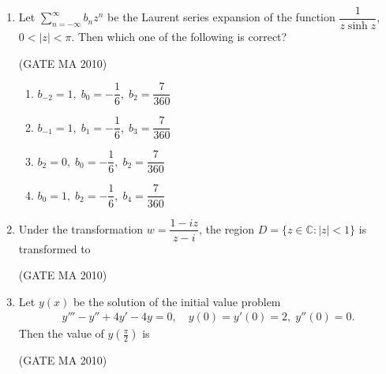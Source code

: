 \documentclass[journal,12pt,onecolumn]{IEEEtran}
\theoremstyle{remark}
\begin{document}
\begin{flushleft}
\begin{enumerate}
\item Let $\sum\limits_{n=-\infty}^{\infty} b_n z^n$ be the Laurent series expansion of the function $\dfrac{1}{z\sinh z}$, $0<\lvert z\rvert<\pi$. Then which one of the following is correct? \underline{\hspace{2cm}}

\hfill(GATE MA 2010)

\begin{enumerate}
\item $b_{-2}=1,\; b_0=-\dfrac{1}{6},\; b_2=\dfrac{7}{360}$
\item $b_{-1}=1,\; b_1=-\dfrac{1}{6},\; b_3=\dfrac{7}{360}$
\item $b_2=0,\; b_0=-\dfrac{1}{6},\; b_2=\dfrac{7}{360}$
\item $b_0=1,\; b_2=-\dfrac{1}{6},\; b_4=\dfrac{7}{360}$
\end{enumerate}

\item Under the transformation $w=\dfrac{1-iz}{z-i}$, the region $D=\{z\in\mathbb{C}\colon\lvert z\rvert<1\}$ is transformed to \underline{\hspace{2cm}}

\hfill(GATE MA 2010)

\begin{enumerate}
\end{enumerate}
\newpage
\item Let $y(x)$ be the solution of the initial value problem
\begin{align*}
y'''-y''+4y'-4y=0,\quad y(0)=y'(0)=2,\; y''(0)=0.
\end{align*}
Then the value of $y\left(\tfrac{\pi}{2}\right)$ is \underline{\hspace{2cm}}

\hfill(GATE MA 2010)


\end{enumerate}
\end{flushleft}
\end{document}
